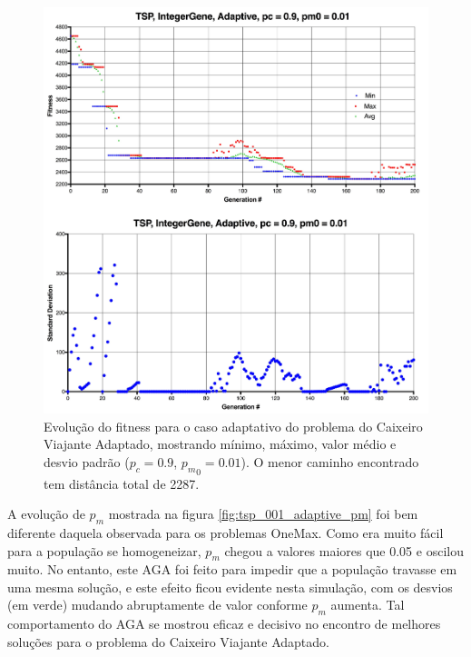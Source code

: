 \begin{figure}[ht!]
    \centering \includegraphics[width=1.0\textwidth]{tsp_001_adaptive.jpg}
    \caption{Evolução do fitness para o caso adaptativo do problema do Caixeiro Viajante Adaptado, mostrando mínimo, máximo, valor médio e desvio padrão ($p_c=0.9$, ${p_m}_0=0.01$). O menor caminho encontrado tem distância total de 2287.}
    \label{fig:tsp_001_adaptative}
\end{figure}

A evolução de $p_m$ mostrada na figura \ref{fig:tsp_001_adaptive_pm} foi bem diferente daquela observada para os problemas OneMax. Como era muito fácil para a população se homogeneizar, $p_m$ chegou a valores maiores que 0.05 e oscilou muito. No entanto, este AGA foi feito para impedir que a população travasse em uma mesma solução, e este efeito ficou evidente nesta simulação, com os desvios (em verde) mudando abruptamente de valor conforme $p_m$ aumenta. Tal comportamento do AGA se mostrou eficaz e decisivo no encontro de melhores soluções para o problema do Caixeiro Viajante Adaptado.

